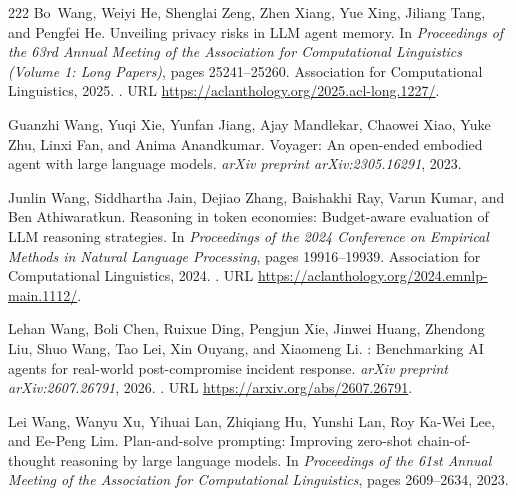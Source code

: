 \begin{thebibliography}{222}
Bo~Wang, Weiyi He, Shenglai Zeng, Zhen Xiang, Yue Xing, Jiliang Tang, and
  Pengfei He.
\newblock Unveiling privacy risks in {LLM} agent memory.
\newblock In \emph{Proceedings of the 63rd Annual Meeting of the Association
  for Computational Linguistics (Volume 1: Long Papers)}, pages 25241--25260.
  Association for Computational Linguistics, 2025.
\newblock {}.
\newblock URL \url{https://aclanthology.org/2025.acl-long.1227/}.

Guanzhi Wang, Yuqi Xie, Yunfan Jiang, Ajay Mandlekar, Chaowei Xiao, Yuke Zhu,
  Linxi Fan, and Anima Anandkumar.
\newblock Voyager: An open-ended embodied agent with large language models.
\newblock \emph{arXiv preprint arXiv:2305.16291}, 2023{}.

Junlin Wang, Siddhartha Jain, Dejiao Zhang, Baishakhi Ray, Varun Kumar, and Ben
  Athiwaratkun.
\newblock Reasoning in token economies: Budget-aware evaluation of {LLM}
  reasoning strategies.
\newblock In \emph{Proceedings of the 2024 Conference on Empirical Methods in
  Natural Language Processing}, pages 19916--19939. Association for
  Computational Linguistics, 2024{}.
\newblock {}.
\newblock URL \url{https://aclanthology.org/2024.emnlp-main.1112/}.

Lehan Wang, Boli Chen, Ruixue Ding, Pengjun Xie, Jinwei Huang, Zhendong Liu,
  Shuo Wang, Tao Lei, Xin Ouyang, and Xiaomeng Li.
: Benchmarking {AI} agents for real-world post-compromise
  incident response.
\newblock \emph{arXiv preprint arXiv:2607.26791}, 2026{}.
\newblock {}.
\newblock URL \url{https://arxiv.org/abs/2607.26791}.

Lei Wang, Wanyu Xu, Yihuai Lan, Zhiqiang Hu, Yunshi Lan, Roy Ka-Wei Lee, and
  Ee-Peng Lim.
\newblock Plan-and-solve prompting: Improving zero-shot chain-of-thought
  reasoning by large language models.
\newblock In \emph{Proceedings of the 61st Annual Meeting of the Association
  for Computational Linguistics}, pages 2609--2634, 2023{}.


\end{thebibliography}
